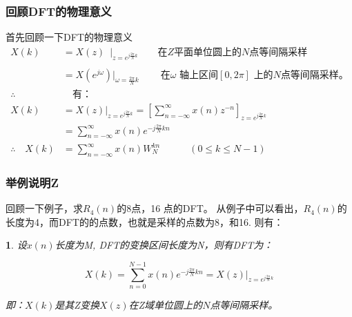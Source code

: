 \documentclass[notheorems,compress,mathserif,table]{beamer}
\newtheorem{dablock}{}
\begin{document}
\begin{frame}[shrink]\frametitle{回顾DFT的物理意义}%

首先回顾一下DFT的物理意义
\begin{equation*}
\begin{split}
X(k)  &= X(z)\;\:\Big|_{z = e^{j\frac{2\pi}{N}k}}  \qquad \mbox{在$Z$平面单位圆上的$N$点等间隔采样}\\
 \quad&\quad\\
      &= X(e^{j\omega})\Big|_{\omega = \frac{2\pi}{N}k} \qquad\: \mbox{在$\omega$ 轴上区间$[0,2\pi]$ 上的$N$点等间隔采样。}\\
\therefore\quad  &\quad\mbox{有：}   \\
X(k) &= X(z)\Big|_{z = e^{j\frac{2\pi}{N}k}} = \left[\sum_{n=-\infty}^{\infty}x(n)z^{-n}\right]_{z = e^{j\frac{2\pi}{N}k}}\\
     &= \sum_{n=-\infty}^{\infty}x(n)e^{-j\frac{2\pi}{N}kn} \\
\therefore\quad X(k) &= \sum_{n=-\infty}^{\infty}x(n)W_N^{kn} \qquad\quad (0 \leq k \leq N-1)
\end{split}
\end{equation*}
\end{frame}




\begin{frame}[shrink]\frametitle{举例说明Z}%
回顾一下例子，求$R_4(n)$的8点，16 点的DFT。
\newline\newline
从例子中可以看出，$R_4(n)$的长度为4，而DFT的的点数，也就是采样的点数为8，和16.
\newline\newline
则有：
\begin{dablock}
	设$ x(n) $长度为M, DFT的变换区间长度为N，则有DFT为：
	
	$$ X(k) = \sum_{n=0}^{N-1}x(n)e^{-j\frac{2\pi}{N}kn} = X(z)\Big|_{z = e^{j\frac{2\pi}{N}k}}$$
	

即：$X(k)$是其Z变换$X(z)$在Z域单位圆上的$N$点等间隔采样。
\end{dablock}
\end{frame}
\end{document}
